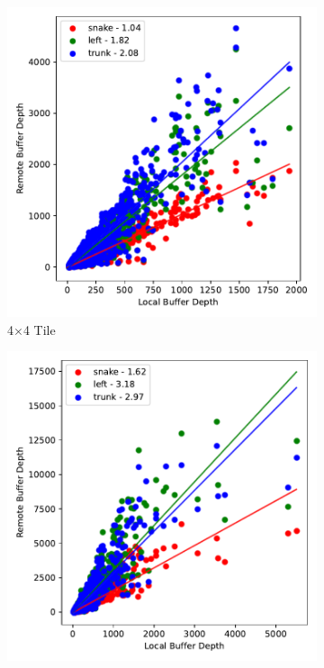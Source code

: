 \begin{figure}
  \centering
  \begin{subfigure}[b]{0.475\textwidth}
      \centering
      \includegraphics[width=\textwidth]{./images/mp60_16_fast_route_fits.pdf}
      \caption[]%
      {\small 4$\times$4 Tile}    
  \end{subfigure}
  \hfill
  \begin{subfigure}[b]{0.475\textwidth}  
      \centering 
      \includegraphics[width=\textwidth]{./images/mp60_64_fast_route_fits.pdf}

\end{subfigure}
\end{figure}
